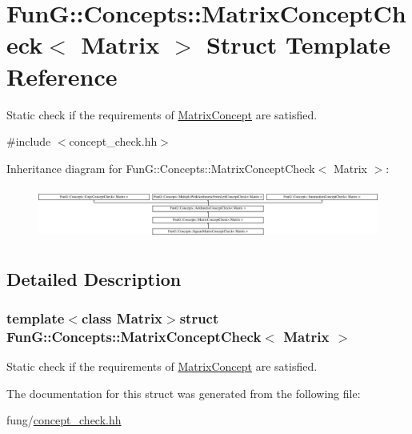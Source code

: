 \hypertarget{structFunG_1_1Concepts_1_1MatrixConceptCheck}{}\section{Fun\+G\+:\+:Concepts\+:\+:Matrix\+Concept\+Check$<$ Matrix $>$ Struct Template Reference}
\label{structFunG_1_1Concepts_1_1MatrixConceptCheck}


Static check if the requirements of \hyperlink{structFunG_1_1Concepts_1_1MatrixConcept}{Matrix\+Concept} are satisfied.  




{\ttfamily \#include $<$concept\+\_\+check.\+hh$>$}

Inheritance diagram for Fun\+G\+:\+:Concepts\+:\+:Matrix\+Concept\+Check$<$ Matrix $>$\+:\begin{figure}[H]
\begin{center}
\leavevmode
\includegraphics[height=1.728395cm]{structFunG_1_1Concepts_1_1MatrixConceptCheck}
\end{center}
\end{figure}


\subsection{Detailed Description}
\subsubsection*{template$<$class Matrix$>$struct Fun\+G\+::\+Concepts\+::\+Matrix\+Concept\+Check$<$ Matrix $>$}

Static check if the requirements of \hyperlink{structFunG_1_1Concepts_1_1MatrixConcept}{Matrix\+Concept} are satisfied. 

The documentation for this struct was generated from the following file\+:\begin{DoxyCompactItemize}
\item 
fung/\hyperlink{concept__check_8hh}{concept\+\_\+check.\+hh}\end{DoxyCompactItemize}
